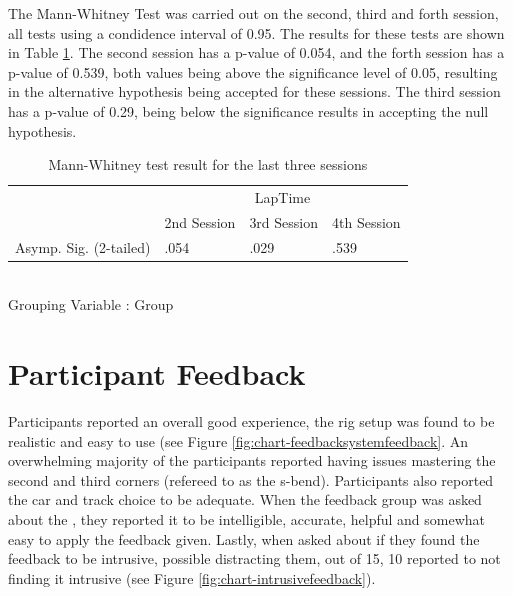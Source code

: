 The Mann-Whitney Test was carried out on the second, third and forth session, all tests using a condidence interval of 0.95. The results for these tests are shown in Table \ref{table:Mann-Whitney-Sessions}. The second session has a p-value of 0.054, and the forth session has a p-value of 0.539, both values being above the significance level of 0.05, resulting in the alternative hypothesis being accepted for these sessions. The third session has a p-value of 0.29, being below the significance results in accepting the null hypothesis.


\begin{table}[]
	\centering
	\begin{tabular}{|l|l|l|l|}
		\hline
		& \multicolumn{3}{c|}{LapTime}            \\ \cline{2-4} 
		& 2nd Session & 3rd Session & 4th Session \\ \hline
		Asymp. Sig. (2-tailed) & .054        & .029        & .539        \\ \hline
	\end{tabular}\\
	Grouping Variable : Group
	\caption[Mann-Whitney Test for last three Sessions]{Mann-Whitney test result for the last three sessions}
	\label{table:Mann-Whitney-Sessions}
\end{table}

\section{Participant Feedback}
\label{sec:eval-usersFeedback}
Participants reported an overall good experience, the rig setup was found to be realistic and easy to use (see Figure \ref{fig:chart-feedbacksystemfeedback}. An overwhelming majority of the participants reported having issues mastering the second and third corners (refereed to as the s-bend). Participants also reported the car and track choice to be adequate. When the feedback group was asked about the \methodname, they reported it to be intelligible, accurate, helpful and somewhat easy to apply the feedback given. Lastly, when asked about if they found the feedback to be intrusive, possible distracting them, out of 15, 10 reported to not finding it intrusive (see Figure \ref{fig:chart-intrusivefeedback}).

